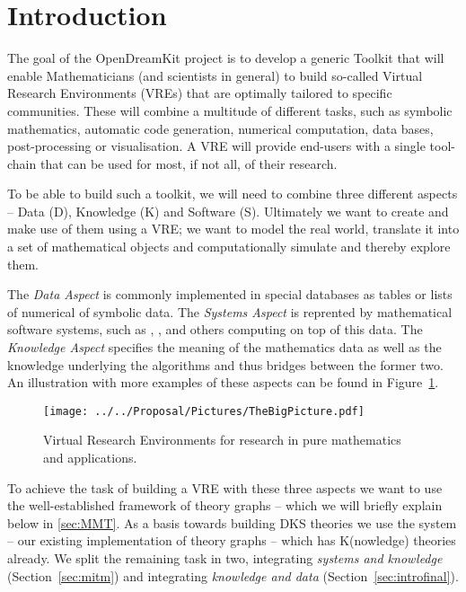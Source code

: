 \section{Introduction}\label{sec:intro}

The goal of the OpenDreamKit project \cite{ODKproposal:on} is to develop a generic Toolkit
that will enable Mathematicians (and scientists in general) to build so-called Virtual
Research Environments (VREs) that are optimally tailored to specific communities. These
will combine a multitude of different tasks, such as symbolic mathematics, automatic code
generation, numerical computation, data bases, post-processing or visualisation. A VRE
will provide end-users with a single tool-chain that can be used for most, if not all, of
their research.

To be able to build such a toolkit, we will need to combine three different aspects --
Data (D), Knowledge (K) and Software (S). Ultimately we want to create and make use of them
using a VRE; we want to model the real world, translate it into a set of mathematical
objects and computationally simulate and thereby explore them.

The \emph{Data Aspect} is commonly implemented in special databases as tables or lists of
numerical of symbolic data. The \emph{Systems Aspect} is reprented by mathematical
software systems, such as \GAP, \SageMath, and others computing on top of this data. The
\emph{Knowledge Aspect} specifies the meaning of the mathematics data as well as the
knowledge underlying the algorithms and thus bridges between the former two. An
illustration with more examples of these aspects can be found in
Figure~\ref{fig:thebigpicture}.

\begin{figure}[H]\centering
  \texttt{[image: ../../Proposal/Pictures/TheBigPicture.pdf]}
  \caption{Virtual Research Environments for research in pure
    mathematics and applications.}
  \label{fig:thebigpicture}
\end{figure}

To achieve the task of building a VRE with these three aspects we want to use the
well-established framework of theory graphs -- which we will briefly explain below in
\ref{sec:MMT}. As a basis towards building DKS theories we use the \MMT system -- our
existing implementation of theory graphs -- which has K(nowledge) theories already. We
split the remaining task in two, integrating \textit{systems and knowledge}
(Section~\ref{sec:mitm}) and integrating \textit{knowledge and data}
(Section~\ref{sec:introfinal}).

